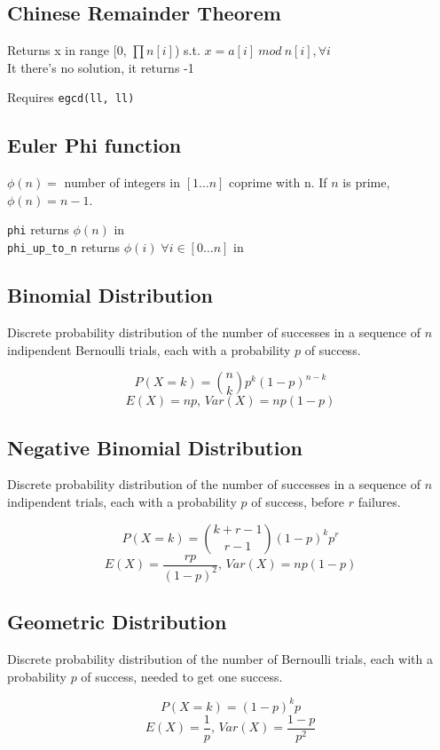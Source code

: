 \subsection{Chinese Remainder Theorem}
Returns x in range [0, $\prod{n[i]}$) s.t.
$x = a[i] \: mod \: n[i], \forall i$ \\
It there's no solution, it returns -1

Requires \verb|egcd(ll, ll)|



\subsection{Euler Phi function}
$\phi(n) = $ number of integers in $[1\ldots n]$ coprime with n. If $n$ is prime, $\phi(n)=n-1$.

\verb|phi| returns $\phi(n)$ in  \\
\verb|phi_up_to_n| returns $\phi(i) \; \forall i \in [0 \ldots n]$ in 



\subsection{Binomial Distribution}
Discrete probability distribution of the number of successes in a sequence
of $n$ indipendent Bernoulli trials, each with a probability $p$ of success.

\[P(X = k) = \binom{n}{k}p^k(1 - p)^{n - k}\]
\[E(X) = np,\,Var(X) = np(1 - p)\]


\subsection{Negative Binomial Distribution}
Discrete probability distribution of the number of successes in a sequence
of $n$ indipendent trials, each with a probability $p$ of success,
before $r$ failures.

\[P(X = k) = \binom{k + r - 1}{r - 1}(1 - p)^kp^r\]
\[E(X) = \frac{rp}{(1 - p)^2},\,Var(X) = np(1 - p)\]


\subsection{Geometric Distribution}
Discrete probability distribution of the number of Bernoulli trials,
each with a probability $p$ of success, needed to get one success.

\[P(X = k) = (1 - p)^kp\]
\[E(X) = \frac{1}{p},\,Var(X) = \frac{1 - p}{p^2}\]


